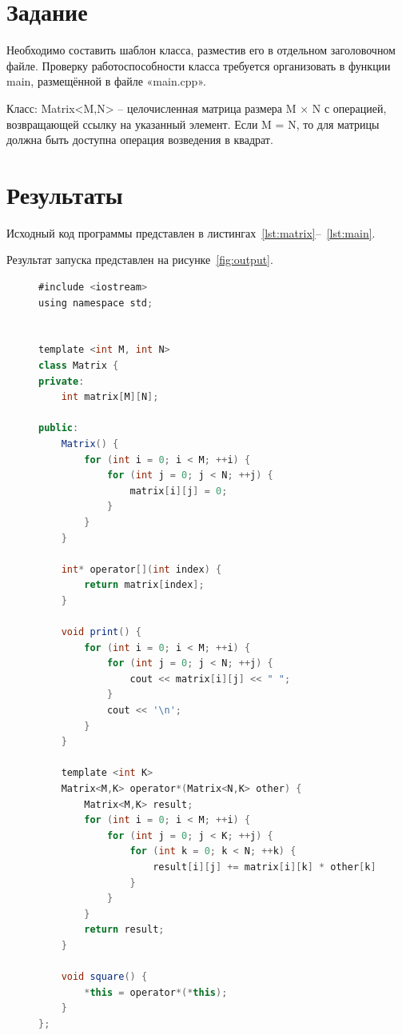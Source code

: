 \documentclass[a4paper, 14pt]{extarticle}
\begin{document}
\renewcommand{\ttdefault}{pcr}

\setlength{\tabcolsep}{3pt}
\newpage
\setcounter{page}{2}

\section{Задание}\label{Sect::task}

Необходимо составить шаблон класса,
разместив его в отдельном заголовочном файле. Проверку работоспособности класса
требуется организовать в функции main, размещённой в файле «main.cpp».

Класс: Matrix<M,N> – целочисленная матрица размера
M × N с операцией, возвращающей ссылку на
указанный элемент. Если M = N, то для матрицы
должна быть доступна операция возведения в
квадрат.

\section{Результаты}\label{Sect::res}

Исходный код программы представлен в листингах~\ref{lst:matrix}--~\ref{lst:main}.

Результат запуска представлен на рисунке~\ref{fig:output}.

\begin{figure}[!htb]
\begin{lstlisting}[language=Java,caption={Класс Matrix},label={lst:matrix}]
#include <iostream>
using namespace std;


template <int M, int N>
class Matrix {
private:
    int matrix[M][N];

public:
    Matrix() {
        for (int i = 0; i < M; ++i) {
            for (int j = 0; j < N; ++j) {
                matrix[i][j] = 0;
            }
        }
    }

    int* operator[](int index) {
        return matrix[index];
    }
    
    void print() {
        for (int i = 0; i < M; ++i) {
            for (int j = 0; j < N; ++j) {
                cout << matrix[i][j] << " ";
            }
            cout << '\n';
        }
    }
    
    template <int K>
    Matrix<M,K> operator*(Matrix<N,K> other) {
        Matrix<M,K> result;
        for (int i = 0; i < M; ++i) {
            for (int j = 0; j < K; ++j) {
                for (int k = 0; k < N; ++k) {
                    result[i][j] += matrix[i][k] * other[k][j];
                }
            }
        }
        return result;
    }

    void square() {
        *this = operator*(*this);
    }  
};

\end{lstlisting}
\end{figure}
\end{document}
